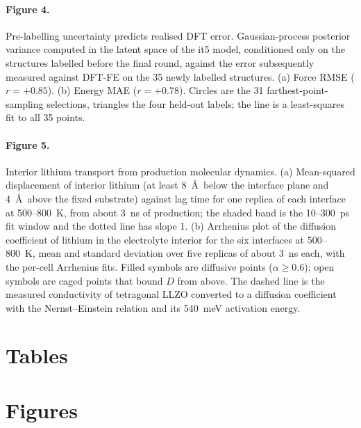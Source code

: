 \documentclass[11pt]{article}
\begin{document}
\paragraph{Figure 4.} \label{fig:uq} Pre-labelling uncertainty predicts
realised DFT error. Gaussian-process posterior variance computed in the latent
space of the it5 model, conditioned only on the structures labelled before the
final round, against the error subsequently measured against DFT-FE on the 35
newly labelled structures. (a) Force RMSE ($r=+0.85$). (b) Energy MAE
($r=+0.78$). Circles are the 31 farthest-point-sampling selections, triangles
the four held-out labels; the line is a least-squares fit to all 35 points.

\paragraph{Figure 5.} \label{fig:msd} Interior lithium transport from
production molecular dynamics. (a) Mean-squared displacement of interior
lithium (at least 8~\AA\ below the interface plane and 4~\AA\ above the fixed
substrate) against lag time for one replica of each interface at 500--800~K,
from about 3~ns of production; the shaded band is the 10--300~ps fit window
and the dotted line has slope 1. (b) Arrhenius plot of the diffusion coefficient of
lithium in the electrolyte interior for the six interfaces at 500--800~K, mean
and standard deviation over five replicas of about 3~ns each, with the per-cell
Arrhenius fits. Filled symbols are diffusive points ($\alpha\geq0.6$); open
symbols are caged points that bound $D$ from above. The dashed line is the
measured conductivity of tetragonal LLZO\citep{Awaka2009} converted to a
diffusion coefficient with the Nernst--Einstein relation and its 540~meV
activation energy.

\section*{Tables}

\section*{Figures}
\end{document}
